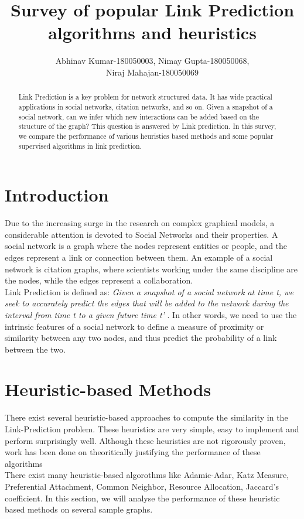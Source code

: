 \documentclass[review]{elsarticle}
\begin{document}
\begin{frontmatter}
\title{\textbf{Survey of popular Link Prediction algorithms and heuristics}}
\author{Abhinav Kumar-180050003, Nimay Gupta-180050068, \\ Niraj Mahajan-180050069}

\begin{abstract}
Link Prediction is a key problem for network structured data. It has wide practical applications in social networks, citation networks, and so on. Given a snapshot of a social network, can we infer which new interactions can be added based on the structure of the graph? This question is answered by Link prediction. In this survey, we compare the performance of various heuristics based methods and some popular supervised algorithms in link prediction.
\end{abstract}
\end{frontmatter}


\section{Introduction}
\noindent Due to the increasing surge in the research on complex graphical models, a considerable attention is devoted to Social Networks and their properties. A social network is a graph where the nodes represent entities or people, and the edges represent a link or connection between them. An example of a social network is citation graphs, where scientists working under the same discipline are the nodes, while the edges represent a collaboration. \\
Link Prediction is defined as: \textit{Given a snapshot of a social network at time t, we seek to accurately predict the edges that will be added to the network during the interval from time t to a given future time t'} \cite{liben_nowell_paper}. In other words, we need to use the intrinsic features of a social network to define a measure of proximity or similarity between any two nodes, and thus predict the probability of a link between the two.
\section{Heuristic-based Methods}
\noindent There exist several heuristic-based approaches to compute the similarity in the Link-Prediction problem. These heuristics are very simple, easy to implement and perform surprisingly well. Although these heuristics are not rigorously proven, work has been done on theoritically justifying the performance of these algorithms \cite{theoretical_justification_heuristics} \\There exist many heuristic-based algorothms like Adamic-Adar, Katz Measure, Preferential Attachment, Common Neighbor, Resource Allocation, Jaccard's coefficient. In this section, we will analyse the performance of these heuristic based methods on several sample graphs.
\end{document}
